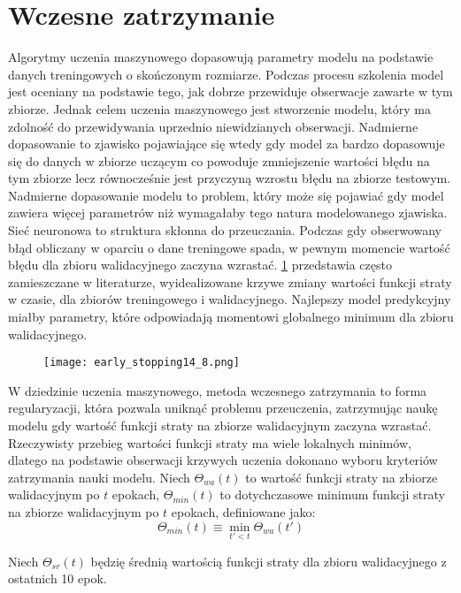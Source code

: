 \documentclass[]{article}
\theoremstyle{definition}
\begin{document}
\section{Wczesne zatrzymanie}
Algorytmy uczenia maszynowego dopasowują parametry modelu na podstawie danych treningowych o skończonym rozmiarze. Podczas procesu szkolenia model jest oceniany na podstawie tego, jak dobrze przewiduje obserwacje zawarte w tym zbiorze. Jednak celem uczenia maszynowego jest stworzenie modelu, który ma zdolność do przewidywania uprzednio niewidzianych obserwacji. Nadmierne dopasowanie to zjawisko pojawiające się wtedy gdy model za bardzo dopasowuje się do danych w zbiorze uczącym co powoduje zmniejszenie wartości błędu na tym zbiorze lecz równocześnie jest przyczyną wzrostu błędu na zbiorze testowym. Nadmierne dopasowanie modelu to problem, który może się pojawiać gdy model zawiera więcej parametrów niż wymagałaby tego natura modelowanego zjawiska. Sieć neuronowa to struktura skłonna do przeuczania. Podczas gdy obserwowany błąd obliczany w oparciu o dane treningowe spada, w pewnym momencie wartość błędu dla zbioru walidacyjnego zaczyna wzrastać. \figurename{} \ref{fig:loss_curves} przedstawia często zamieszczane w literaturze, wyidealizowane krzywe zmiany wartości funkcji straty w czasie, dla zbiorów treningowego i walidacyjnego. Najlepszy model predykcyjny miałby parametry, które odpowiadają momentowi globalnego minimum dla zbioru walidacyjnego.




\begin{figure}[htp!]
	\centering
	\texttt{[image: early\_stopping14\_8.png]}
	\caption{}
	\label{fig:loss_curves}
\end{figure}

W dziedzinie uczenia maszynowego, metoda wczesnego zatrzymania to forma regularyzacji, która pozwala uniknąć problemu przeuczenia, zatrzymując naukę modelu gdy wartość funkcji straty na zbiorze walidacyjnym zaczyna wzrastać. Rzeczywisty przebieg wartości funkcji straty ma wiele lokalnych minimów, dlatego na podstawie obserwacji krzywych uczenia dokonano wyboru kryteriów zatrzymania nauki modelu. 
 Niech $\Theta_{wa}(t)$ to wartość funkcji straty na zbiorze walidacyjnym po $t$ epokach, $\Theta_{min}(t)$ to dotychczasowe minimum funkcji straty na zbiorze walidacyjnym po $t$ epokach, definiowane jako:
 $$
 \Theta_{min}(t) \equiv \min_{t' < t} \Theta_{wa}(t')
 $$
 
 Niech $\Theta_{sr}(t)$ będzię średnią wartością funkcji straty dla zbioru walidacyjnego z ostatnich 10 epok.
 
\end{document}
